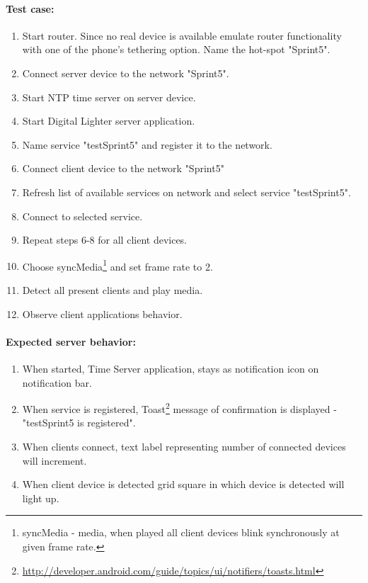  

\paragraph{Test case:}
\begin{enumerate}
\item Start router. Since no real device is available emulate router functionality with one of the phone's tethering option. Name the hot-spot "Sprint5". 
\item Connect server device to the network "Sprint5".
\item Start NTP time server on server device.
\item Start Digital Lighter server application.
\item Name service "testSprint5" and register it to the network.
\item Connect client device to the network "Sprint5"
\item Refresh list of available services on network and select service "testSprint5".
\item Connect to selected service.
\item Repeat steps 6-8 for all client devices.  
\item Choose syncMedia\footnote{syncMedia - media, when played all client devices blink synchronously at given frame rate.} and set frame rate to 2.
\item Detect all present clients and play media.
\item Observe client applications behavior.
\end{enumerate}


\paragraph{Expected server behavior:}
\begin{enumerate}
\item When started, Time Server application, stays as notification icon on notification bar.
\item When service is registered, Toast\footnote{\url{http://developer.android.com/guide/topics/ui/notifiers/toasts.html}} message of confirmation is displayed - "testSprint5 is registered".
\item When clients connect, text label representing number of connected devices will increment.
\item When client device is detected grid square in which device is detected will light up.
\end{enumerate}



